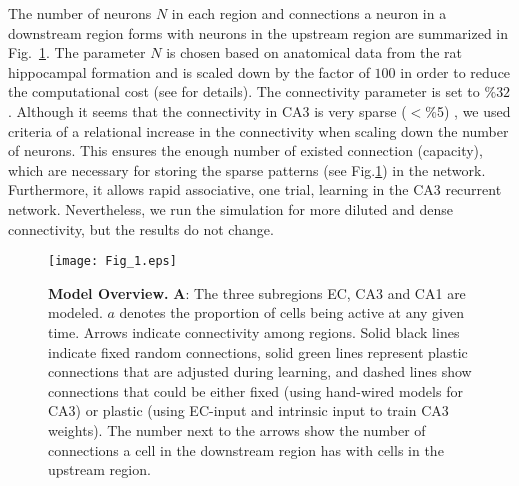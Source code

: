 \documentclass[utf8]{frontiersSCNS} %
\begin{document}
The number of neurons $N$ in each region and connections a neuron in a downstream region forms with neurons in the upstream region are summarized in Fig.~\ref{Fig_1}. The parameter $N$ is chosen based on anatomical data from the rat hippocampal formation \cite{amaral1990chapter, cutsuridis2010hippocampal} and is scaled down by the factor of $100$ in order to reduce the computational cost (see \cite{neher2015memory} for details). The connectivity parameter is set to $\% 32$. 
%
Although it seems that the connectivity in CA3 is very sparse ($< \%$5) \cite{guzman2016synaptic}, we used criteria of a relational increase in the connectivity when scaling down the number of neurons. This ensures the enough number of existed connection (capacity), which are necessary for storing the sparse patterns (see Fig.\:\ref{Fig_1}) in the network.  Furthermore, it allows rapid associative, one trial, learning in the CA3 recurrent network.
%
Nevertheless, we run the simulation for more diluted and dense connectivity, but the results do not change. 

\begin{figure}[!htb]
\centering\texttt{[image: Fig\_1.eps]}
\caption{\textbf{Model Overview.} \textbf A: The three subregions EC, CA3 and CA1 are modeled. $a$ denotes the proportion of cells being active at any given time. Arrows indicate connectivity among regions. Solid black lines indicate fixed random connections, solid green lines represent plastic connections that are adjusted during learning, and dashed lines show connections that could be either fixed (using hand-wired models for CA3) or plastic (using EC-input and intrinsic input to train CA3 weights). The number next to the arrows show the number of connections a cell in the downstream region has with cells in the upstream region.}
\label{Fig_1}
\end{figure}
\end{document}
